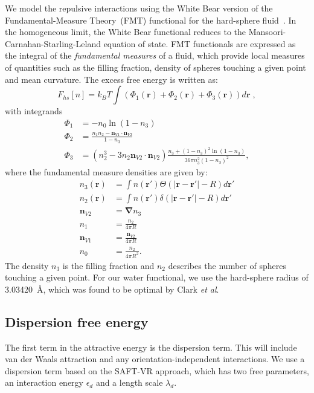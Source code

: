 \documentclass[letterpaper,twocolumn,amsmath,amssymb,prb]{revtex4-1}
\newcommand{\xx}{\textbf{r}}
\begin{document}
We model the repulsive interactions using the White Bear version of
the Fundamental-Measure Theory~(FMT) functional for the hard-sphere
fluid~\cite{roth2002whitebear}.  In the homogeneous limit, the White
Bear functional reduces to the Mansoori-Carnahan-Starling-Leland
equation of state.  FMT functionals are expressed as the integral of
the \emph{fundamental measures} of a fluid, which provide local
measures of quantities such as the filling fraction, density of
spheres touching a given point and mean curvature.  The excess free
energy is written as:
\begin{equation}
F_{hs}[n] = k_B T \int (\Phi_1(\xx) + \Phi_2(\xx) + \Phi_3(\xx)) d\xx \; ,
\end{equation}
with integrands
\begin{align}
\Phi_1 &= -n_0 \ln\left( 1 - n_3\right)\\
\Phi_2 &= \frac{n_1 n_2 - \mathbf{n}_{V1} \cdot\mathbf{n}_{V2}}{1-n_3} \\
\Phi_3 &= (n_2^3 - 3n_2 \mathbf{n}_{V2} \cdot \mathbf{n}_{V2})
  \frac{
    n_3 + (1-n_3)^2\ln(1-n_3)
  }{
    36\pi n_3^2\left( 1 - n_3 \right)^2
  } ,
\end{align}
where the fundamental measure densities are given by:
\begin{align}
  n_3(\xx) &= \int n(\xx') \Theta(\left|\xx - \xx'\right| - R) d\xx' \\
  n_2(\xx) &= \int n(\xx') \delta(\left|\xx - \xx'\right| - R) d\xx'
  \\
  \mathbf{n}_{V2} &= \mathbf{\nabla} n_3 \\
  n_1 &= \frac{n_2}{4\pi R}\\
  \mathbf{n}_{V1} &= \frac{\mathbf{n}_{V2}}{4\pi R}\\
  n_0 &= \frac{n_2}{4\pi R^2}.
\end{align}
The density $n_3$ is the filling fraction and $n_2$ describes the number
of spheres touching a given point. For our water functional, we use the 
hard-sphere radius of
3.03420~\AA, which was found to be optimal by Clark
\emph{et al}.\cite{clark2006developing}

\newcommand\etadisp{\ensuremath{\eta_\textit{d}}}
\newcommand\epsilondisp{\ensuremath{\epsilon_\textit{d}}}
\newcommand\epsilonassoc{\ensuremath{\epsilon_\textit{a}}}
\newcommand\lambdadisp{\ensuremath{\lambda_\textit{d}}}
\newcommand\lscale{\ensuremath{s_d}}
\subsection{Dispersion free energy}
The first term in the attractive energy is the dispersion term.  This
will include van der Waals attraction and any orientation-independent
interactions. We use a
dispersion term based on the SAFT-VR
approach\cite{gil-villegas-1997-SAFT-VR}, which has two free
parameters, an interaction energy $\epsilondisp$ and a
length scale $\lambdadisp$.
\end{document}
